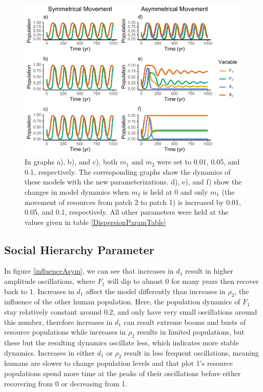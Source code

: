 \documentclass[
  12pt,
]{article}
\begin{document}
\begin{figure}
\centering
\includegraphics{Wulfing_CH2_Draft4_files/figure-latex/Movement-1.pdf}
\caption{\label{fig:Movement}In graphs a), b), and c), both \(m_1\) and \(m_2\) were set to 0.01, 0.05, and 0.1, respectively. The corresponding graphs show the dynamics of these models with the new parameterizations. d), e), and f) show the changes in model dynamics when \(m_2\) is held at 0 and only \(m_1\) (the movement of resources from patch 2 to patch 1) is increased by 0.01, 0.05, and 0.1, respectively. All other parameters were held at the values given in table \ref{DispersionParamTable} \label{Movement}}
\end{figure}

\hypertarget{social-hierarchy-parameter}{%
\subsection{Social Hierarchy Parameter}\label{social-hierarchy-parameter}}

In figure \ref{influenceAsym}, we can see that increases in \(d_1\) result in higher amplitude oscillations, where \(F_1\) will dip to almost 0 for many years then recover back to 1. Increases in \(d_1\) affect the model differently than increases in \(\rho_2\), the influence of the other human population. Here, the population dynamics of \(F_1\) stay relatively constant around 0.2, and only have very small oscillations around this number, therefore increases in \(d_1\) can result extreme booms and busts of resource populations while increases in \(\rho_2\) results in limited populations, but these but the resulting dynamics oscillate less, which indicates more stable dynamics. Increases in either \(d_1\) or \(\rho_2\) result in less frequent oscillations, meaning humans are slower to change population levels and that plot 1's resource populations spend more time at the peaks of their oscillations before either recovering from 0 or decreasing from 1.
\end{document}
